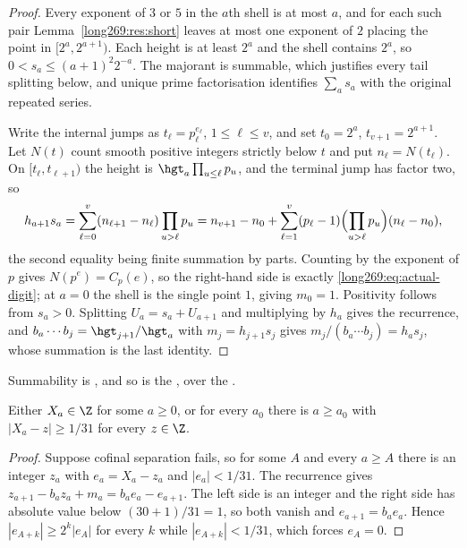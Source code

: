 \begin{proof}
Every exponent of $3$ or $5$ in the $a$th shell is at most $a$, and for each
such pair Lemma~\ref{long269:res:short} leaves at most one exponent of $2$ placing the
point in $[2^{a},2^{a+1})$.  Each height is at least $2^{a}$ and the shell
contains $2^{a}$, so $0<s_a\le(a+1)^{2}2^{-a}$.  The majorant is summable,
which justifies every tail splitting below, and unique prime factorisation
identifies $\sum_a s_a$ with the original repeated series.

Write the internal jumps as $t_\ell=p_\ell^{e_\ell}$, $1\le\ell\le v$, and set
$t_0=2^{a}$, $t_{v+1}=2^{a+1}$.  Let $N(t)$ count smooth positive integers
strictly below $t$ and put $n_\ell=N(t_\ell)$.  On $[t_\ell,t_{\ell+1})$ the
height is $\hgt_a\prod_{u\le\ell}p_u$, and the terminal jump has factor two, so
\[
 h_{a+1}s_a
 =\sum_{\ell=0}^{v}(n_{\ell+1}-n_\ell)\prod_{u>\ell}p_u
 =n_{v+1}-n_0+\sum_{\ell=1}^{v}(p_\ell-1)
        \Bigl(\prod_{u>\ell}p_u\Bigr)(n_\ell-n_0),
\]
the second equality being finite summation by parts.  Counting by the exponent
of $p$ gives $N(p^{e})=C_p(e)$, so the right-hand side is exactly
\eqref{long269:eq:actual-digit}; at $a=0$ the shell is the single point $1$, giving
$m_0=1$.  Positivity follows from $s_a>0$.  Splitting $U_a=s_a+U_{a+1}$ and
multiplying by $h_a$ gives the recurrence, and
$b_a\cdots b_j=\hgt_{j+1}/\hgt_a$ with $m_j=h_{j+1}s_j$ gives
$m_j/(b_a\cdots b_j)=h_as_j$, whose summation is the last identity.
\end{proof}

\noindent Summability is
,
and so is the
, over the
.

\begin{proposition}\label{long269:res:actual-dichotomy}
Either $X_a\in\Z$ for some $a\ge0$, or for every $a_0$ there is $a\ge a_0$ with
$|X_a-z|\ge1/31$ for every $z\in\Z$.
\end{proposition}

\begin{proof}
Suppose cofinal separation fails, so for some $A$ and every $a\ge A$ there is
an integer $z_a$ with $e_a=X_a-z_a$ and $|e_a|<1/31$.  The recurrence gives
$z_{a+1}-b_az_a+m_a=b_ae_a-e_{a+1}$.  The left side is an integer and the right
side has absolute value below $(30+1)/31=1$, so both vanish and
$e_{a+1}=b_ae_a$.  Hence $|e_{A+k}|\ge2^{k}|e_A|$ for every $k$ while
$|e_{A+k}|<1/31$, which forces $e_A=0$.
\end{proof}

